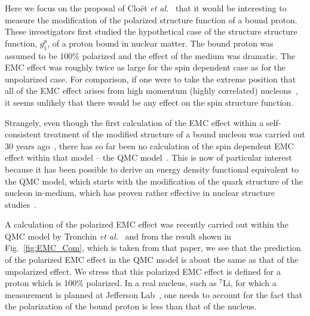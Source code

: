 Here we focus on the proposal of Clo\"et {\it et al.}~\cite{Cloet:2005rt,Cloet:2006bq} that it would be interesting to measure the modification of the polarized structure function of a bound proton. These investigators first studied the hypothetical case of the structure structure function, $g_1^p$, of a proton bound in nuclear matter.  The bound proton was assumed to be 100\% polarized and the effect of the medium was dramatic. The EMC effect was roughly twice as large for the spin dependent case as for the unpolarized case.  For comparison, if one were to take the extreme position that all of the EMC effect arises from high momentum (highly correlated) nucleons~\cite{Weinstein:2010rt}, it seems unlikely that there would be any effect on the spin structure function.

Strangely, even though the first calculation of the EMC effect within a self-consistent treatment of the modified structure of a bound nucleon was carried out 30 years ago~\cite{Thomas:1989vt}, there has so far 
been no calculation of the spin dependent EMC effect within that model -- the 
QMC model~\cite{Guichon:1995ue}. This is now of particular interest because it has been possible to derive an energy density functional equivalent to the QMC model, which starts with the modification of the quark structure of the nucleon in-medium, which has proven rather effective in nuclear structure studies~\cite{Guichon:2018uew,Stone:2017oqt,Stone:2016qmi}. 

A calculation of the polarized EMC effect was recently carried out within the QMC model by 
Tronchin {\it et al.}~\cite{Tronchin:2018mvu} and from the result shown in Fig.~\ref{fig:EMC_Com}, which is taken from that paper, we see that the prediction of the polarized EMC effect in the QMC model is about the same as that of the unpolarized effect.  We stress that this polarized EMC effect is defined for a proton which is 100\% polarized. In a real nucleus, such as $^7$Li, for which a measurement is planned at Jefferson Lab~\cite{JLab}, one needs to account for the fact that the polarization of the bound proton is less than that of the nucleus. 




